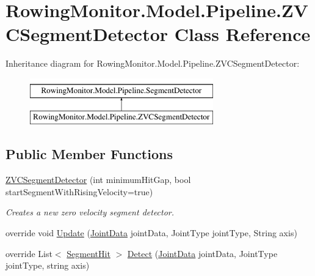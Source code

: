 \hypertarget{class_rowing_monitor_1_1_model_1_1_pipeline_1_1_z_v_c_segment_detector}{}\section{Rowing\+Monitor.\+Model.\+Pipeline.\+Z\+V\+C\+Segment\+Detector Class Reference}
\label{class_rowing_monitor_1_1_model_1_1_pipeline_1_1_z_v_c_segment_detector}
Inheritance diagram for Rowing\+Monitor.\+Model.\+Pipeline.\+Z\+V\+C\+Segment\+Detector\+:\begin{figure}[H]
\begin{center}
\leavevmode
\includegraphics[height=2.000000cm]{class_rowing_monitor_1_1_model_1_1_pipeline_1_1_z_v_c_segment_detector}
\end{center}
\end{figure}
\subsection*{Public Member Functions}
\begin{DoxyCompactItemize}
\item 
\hyperlink{class_rowing_monitor_1_1_model_1_1_pipeline_1_1_z_v_c_segment_detector_ae8612877f3f7310db743529f61547616}{Z\+V\+C\+Segment\+Detector} (int minimum\+Hit\+Gap, bool start\+Segment\+With\+Rising\+Velocity=true)
\begin{DoxyCompactList}\small\item\em Creates a new zero velocity segment detector. \end{DoxyCompactList}\item 
override void \hyperlink{class_rowing_monitor_1_1_model_1_1_pipeline_1_1_z_v_c_segment_detector_a81c28e4ede1561c2fe1eca29f63f0767}{Update} (\hyperlink{struct_rowing_monitor_1_1_model_1_1_util_1_1_joint_data}{Joint\+Data} joint\+Data, Joint\+Type joint\+Type, String axis)
\item 
override List$<$ \hyperlink{struct_rowing_monitor_1_1_model_1_1_util_1_1_segment_hit}{Segment\+Hit} $>$ \hyperlink{class_rowing_monitor_1_1_model_1_1_pipeline_1_1_z_v_c_segment_detector_afc9e7a0ab77b102a7fcd1bb3d216763d}{Detect} (\hyperlink{struct_rowing_monitor_1_1_model_1_1_util_1_1_joint_data}{Joint\+Data} joint\+Data, Joint\+Type joint\+Type, string axis)
\end{DoxyCompactItemize}
